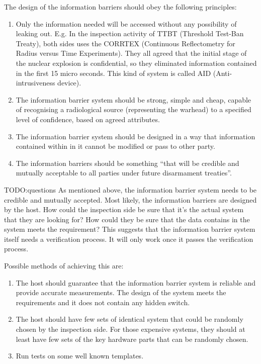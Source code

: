 \documentclass[twoside,titlepage,11pt,twocolumn,a4paper]{article}
\begin{document}
The design of the information barriers should obey the following
principles:
\begin{enumerate}
  \item Only the information needed will be accessed without any
    possibility of leaking out. E.g. In the inspection activity of
    TTBT (Threshold Test-Ban Treaty), both sides uses the CORRTEX
    (Continuous Reflectometry for Radius versus Time
    Experiments). \citep{deupree1981} They all agreed that the initial
    stage of the nuclear explosion is confidential, so they eliminated
    information contained in the first 15 micro seconds. This kind of
    system is called AID (Anti-intrusiveness device).
  \item The information barrier system should be strong, simple and
    cheap, capable of recognising a radiological source (representing
    the warhead) to a specified level of confidence, based on agreed
    attributes.
  \item The information barrier system should be designed in a way
    that information contained within in it cannot be modified or pass
    to other party.
  \item The information barriers should be something ``that will be
    credible and mutually acceptable to all parties under future
    disarmament treaties''. \citep{shultz2007}
\end{enumerate}

TODO:questions
As mentioned above, the information barrier system
needs to be credible and mutually accepted. Most likely, the
information barriers are designed by the host. How could the
inspection side be sure that it's the actual system that they are
looking for? How could they be sure that the data contains in the
system meets the requirement? This suggests that the information
barrier system itself needs a verification process. It will only work
once it passes the verification process.

Possible methods of achieving this are:
\begin{enumerate}
  \item The host should guarantee that the information barrier system
    is reliable and provide accurate measurements. The design of the
    system meets the requirements and it does not contain any hidden
    switch.
  \item The host should have few sets of identical system that could
    be randomly chosen by the inspection side. For those expensive
    systems, they should at least have few sets of the key hardware
    parts that can be randomly chosen.
  \item Run tests on some well known templates.
\end{enumerate}
\end{document}
